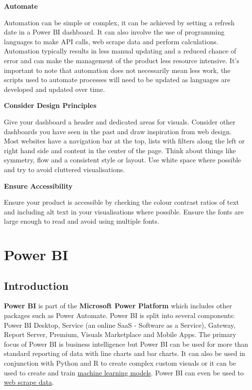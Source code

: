 \documentclass[
]{book}
\begin{document}
\textbf{Automate }

Automation can be simple or complex, it can be achieved by setting a refresh date in a Power BI dashboard. It can also involve the use of programming languages to make API calls, web scrape data and perform calculations. Automation typically results in less manual updating and a reduced chance of error and can make the management of the product less resource intensive. It's important to note that automation does not necessarily mean less work, the scripts used to automate processes will need to be updated as languages are developed and updated over time.

\textbf{Consider Design Principles}

Give your dashboard a header and dedicated areas for visuals. Consider other dashboards you have seen in the past and draw inspiration from web design. Most websites have a navigation bar at the top, lists with filters along the left or right hand side and content in the center of the page. Think about things like symmetry, flow and a consistent style or layout. Use white space where possible and try to avoid cluttered visualisations.

\textbf{Ensure Accessibility}

Ensure your product is accessible by checking the colour contrast ratios of text and including alt text in your visualisations where possible. Ensure the fonts are large enough to read and avoid using multiple fonts.

\hypertarget{power-bi}{%
\chapter{Power BI}\label{power-bi}}

\hypertarget{introduction}{%
\section{Introduction}\label{introduction}}

\textbf{Power BI} is part of the \textbf{Microsoft Power Platform} which includes other packages such as Power Automate. Power BI is split into several components: Power BI Desktop, Service (an online SaaS - Software as a Service), Gateway, Report Server, Premium, Visuals Marketplace and Mobile Apps. The primary focus of Power BI is business intelligence but Power BI can be used for more than standard reporting of data with line charts and bar charts. It can also be used in conjunction with Python and R to create complex custom visuals or it can be used to create and train \href{https://docs.microsoft.com/en-us/power-bi/connect-data/service-tutorial-build-machine-learning-model}{machine learning models}. Power BI can even be used to \href{https://docs.microsoft.com/en-us/power-bi/connect-data/desktop-connect-to-web-by-example}{web scrape data}.
\end{document}
